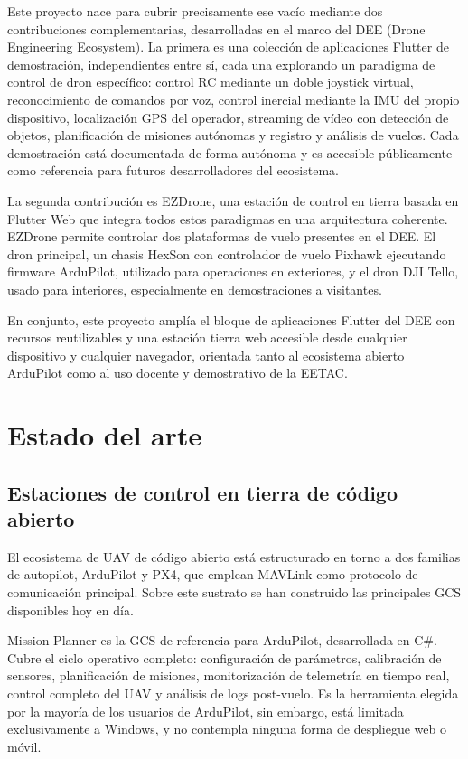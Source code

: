 Este proyecto nace para cubrir precisamente ese vacío mediante dos contribuciones complementarias, desarrolladas en el marco del DEE (Drone Engineering Ecosystem)\cite{dronsEETAC}. La primera es una colección de aplicaciones Flutter de demostración, independientes entre sí, cada una explorando un paradigma de control de dron específico: control RC mediante un doble joystick virtual, reconocimiento de comandos por voz, control inercial mediante la IMU del propio dispositivo, localización GPS del operador, streaming de vídeo con detección de objetos, planificación de misiones autónomas y registro y análisis de vuelos. Cada demostración está documentada de forma autónoma y es accesible públicamente como referencia para futuros desarrolladores del ecosistema.

La segunda contribución es EZDrone, una estación de control en tierra basada en Flutter Web que integra todos estos paradigmas en una arquitectura coherente. EZDrone permite controlar dos plataformas de vuelo presentes en el DEE. El dron principal, un chasis HexSon con controlador de vuelo Pixhawk\cite{pixhawk} ejecutando firmware ArduPilot\cite{ardupilot}, utilizado para operaciones en exteriores, y el dron DJI Tello\cite{tello}, usado para interiores, especialmente en demostraciones a visitantes. 

En conjunto, este proyecto amplía el bloque de aplicaciones Flutter del DEE con recursos reutilizables y una estación tierra web accesible desde cualquier dispositivo y cualquier navegador, orientada tanto al ecosistema abierto ArduPilot como al uso docente y demostrativo de la EETAC.



\section{Estado del arte}
\subsection{Estaciones de control en tierra de código abierto}
El ecosistema de UAV de código abierto está estructurado en torno a dos familias de autopilot, ArduPilot y PX4\cite{px4},  que emplean MAVLink\cite{mavlink} como protocolo de comunicación principal. Sobre este sustrato se han construido las principales GCS disponibles hoy en día.

Mission Planner es la  GCS de referencia para ArduPilot, desarrollada en C\#. Cubre el ciclo operativo completo: configuración de parámetros, calibración de sensores, planificación de misiones, monitorización de telemetría en tiempo real, control completo del UAV y análisis de logs post-vuelo. Es la herramienta elegida por la mayoría de los usuarios de ArduPilot, sin embargo, está limitada exclusivamente a Windows, y no contempla ninguna forma de despliegue web o móvil.

